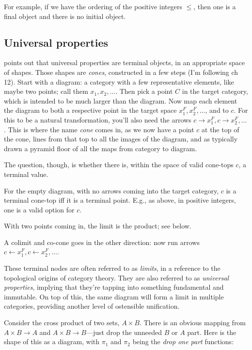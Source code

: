 \documentclass[11pt]{article}
\begin{document}
For example, if we have the ordering of the positive integers $\leq$, then one is a final object
and there is no initial object.

\subsection{Universal properties}\label{universalsec}
\citet{aluffi:zero} points out that universal properties are terminal objects, in an appropriate
space of shapes.
Those shapes are {\em cones}, constructed in a few steps (I'm following \citet{milewski:pigs} ch 12).
Start with a diagram: a category with a few representative elements, like maybe two points; call them
$x_1, x_2, \dots$.
Then pick a point $C$ in the target category, which is intended to be much larger than the diagram.
Now map each element the diagram to both a respective point in the target space $x_1^F, x_2^F, \dots$, and to $c$. For this to be a
natural transformation, you'll also need the arrows $c\to x_1^F, c\to x_2^F, \dots$.
This is where the name {\em cone} comes in, as we now have a point $c$ at the top of the cone, lines
from that top to all the images of the diagram, and as typically drawn a pyramid floor of all the maps from category to
diagram.

The question, though, is whether there is, within the space of valid cone-tops $c$, a terminal value.

For the empty diagram, with no arrows coming into the target category, $c$ is a terminal cone-top
iff it is a terminal point.
E.g., as above, in positive integers, one is a valid option for $c$.


With two points coming in, the limit is the product; see below.

A colimit and co-cone goes in the other direction:
now run arrows $c\leftarrow x_1^F, c\leftarrow x_2^F, \dots$.

These terminal nodes are often referred to as {\em limits}, in a reference to the topological
origins of category theory.
They are also referred to as {\em universal properties}, implying that they're tapping into
something fundamental and immutable.
On top of this, the same diagram will form a
limit in multiple categories, providing another level of ostensible unification.

Consider the cross product of two sets, $A\times B$. There is an obvious mapping from
$A\times B \to A$ and $A\times B \to B$---just drop the unneeded $B$ or $A$ part. Here
is the shape of this as a diagram, with $\pi_1$ and $\pi_2$ being the {\em drop one
part} functions:
\end{document}
